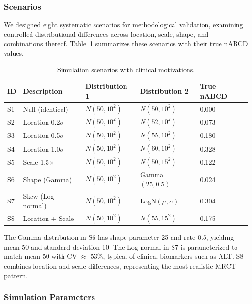 \documentclass[AMA,Times1COL]{WileyNJDv5}
\begin{document}
\subsubsection{Scenarios}

We designed eight systematic scenarios for methodological validation, examining controlled distributional differences across location, scale, shape, and combinations thereof. Table~\ref{tab:scenarios} summarizes these scenarios with their true nABCD values.

\begin{table}[ht]
\caption{Simulation scenarios with clinical motivations.\label{tab:scenarios}}
\begin{tabular*}{\textwidth}{@{\extracolsep\fill}lllll@{}}
\toprule
\textbf{ID} & \textbf{Description} & \textbf{Distribution 1} & \textbf{Distribution 2} & \textbf{True nABCD} \\
\midrule
S1 & Null (identical) & $N(50, 10^2)$ & $N(50, 10^2)$ & 0.000 \\
S2 & Location 0.2$\sigma$ & $N(50, 10^2)$ & $N(52, 10^2)$ & 0.073 \\
S3 & Location 0.5$\sigma$ & $N(50, 10^2)$ & $N(55, 10^2)$ & 0.180 \\
S4 & Location 1.0$\sigma$ & $N(50, 10^2)$ & $N(60, 10^2)$ & 0.328 \\
S5 & Scale 1.5$\times$ & $N(50, 10^2)$ & $N(50, 15^2)$ & 0.122 \\
S6 & Shape (Gamma) & $N(50, 10^2)$ & Gamma$(25, 0.5)$ & 0.024 \\
S7 & Skew (Log-normal) & $N(50, 10^2)$ & LogN$(\mu, \sigma)$ & 0.304 \\
S8 & Location + Scale & $N(50, 10^2)$ & $N(55, 15^2)$ & 0.175 \\
\bottomrule
\end{tabular*}
\begin{tablenotes}
\item The Gamma distribution in S6 has shape parameter 25 and rate 0.5, yielding mean 50 and standard deviation 10. The Log-normal in S7 is parameterized to match mean 50 with CV $\approx$ 53\%, typical of clinical biomarkers such as ALT. S8 combines location and scale differences, representing the most realistic MRCT pattern.
\end{tablenotes}
\end{table}

\subsubsection{Simulation Parameters}
\end{document}

